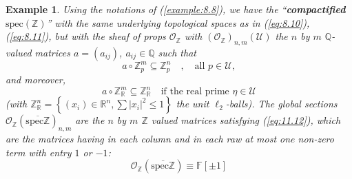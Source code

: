 \documentclass[leqno]{article}
\newcommand{\myemph}[1]{{\it{\bf{#1}}}}
\newcommand{\bigo}{\mathcal{O} }
\newcommand{\F}{\mathbb{F}}
\newcommand{\Q}{\mathbb{Q}}
\newcommand{\R}{\mathbb{R}}
\newcommand{\Z}{\mathbb{Z}}
\newtheorem{example}[equation]{Example}
\numberwithin{equation}{section}
\begin{document}
\begin{example}
				Using the notations of (\ref{example:8.8}), we have the ``\myemph{compactified
				$\text{spec}(\Z)$}'' with the same underlying topological spaces as in
				(\ref{eq:8.10}), (\ref{eq:8.11}), but with the sheaf of props $\bigo_{\Z}$ with
				$(\bigo_{\Z})_{n,m}(\mathscr{U})$ the $n$ by $m$ $\Q$-valued matrices \break $a=(a_{ij})$,
				$a_{ij}\in \Q$ such that 
				\begin{equation}
								a\circ \Z_{p}^{m}\subseteq \Z_{p}^{n} \quad , \quad \text{all $p\in \mathscr{U}$},
								\label{eq:11.11}
				\end{equation}
				and moreover, 
				\begin{equation}
								a\circ\Z_{\R}^{m}\subseteq \Z_{\R}^{n} \quad \text{if the real prime
								$\eta\in \mathscr{U}$}
								\label{eq:11.12}
				\end{equation}
				(with $\Z_{\R}^{n}=\left\{ (x_{i})\in\R^{n}, \sum |x_i|^2\le 1 \right\}$ the unit
				$\ell_2$-balls). The global sections
				$\bigo_{\Z}(\overline{\text{spec}\Z})_{n,m}$ are the $n$ by $m$ $\Z$ valued
				matrices satisfying (\ref{eq:11.12}), which are the matrices having in each column
				and in each raw at most one non-zero term with entry $1$ or $-1$:
				\begin{equation}
								\bigo_{\Z}(\overline{\text{spec}\Z})\equiv \F[\pm 1]
								\label{eq:11.13}
				\end{equation}
\end{example}
\end{document}
